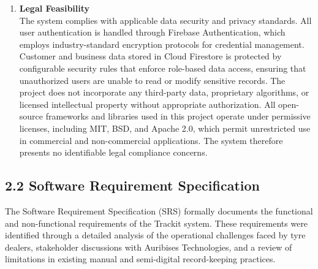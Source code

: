 \documentclass[12pt, oneside]{article}
\begin{document}
\begin{enumerate}
    \item \textbf{Legal Feasibility}\\[0.25cm]
    The system complies with applicable data security and privacy standards. All user authentication is handled through Firebase Authentication, which employs industry-standard encryption protocols for credential management. Customer and business data stored in Cloud Firestore is protected by configurable security rules that enforce role-based data access, ensuring that unauthorized users are unable to read or modify sensitive records. The project does not incorporate any third-party data, proprietary algorithms, or licensed intellectual property without appropriate authorization. All open-source frameworks and libraries used in this project operate under permissive licenses, including MIT, BSD, and Apache 2.0, which permit unrestricted use in commercial and non-commercial applications. The system therefore presents no identifiable legal compliance concerns.

\end{enumerate}

\subsection*{2.2 Software Requirement Specification}

The Software Requirement Specification (SRS) formally documents the functional and non-functional requirements of the Trackit system. These requirements were identified through a detailed analysis of the operational challenges faced by tyre dealers, stakeholder discussions with Auribises Technologies, and a review of limitations in existing manual and semi-digital record-keeping practices.

\vspace{0.5em}
\end{document}
